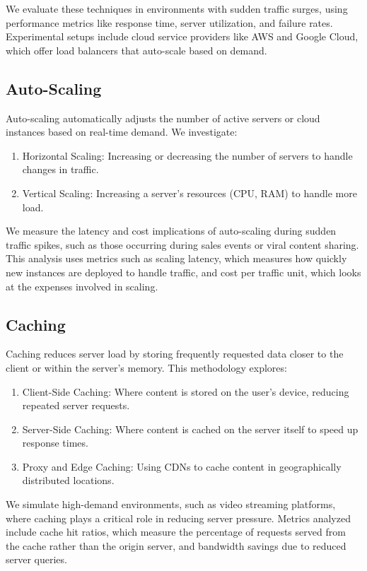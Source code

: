 \documentclass{article}
\begin{document}
We evaluate these techniques in environments with sudden traffic surges, using performance metrics like response time, server utilization, and failure rates. Experimental setups include cloud service providers like AWS and Google Cloud, which offer load balancers that auto-scale based on demand.

\subsection{Auto-Scaling}
Auto-scaling automatically adjusts the number of active servers or cloud instances based on real-time demand. We investigate:

\begin{enumerate}
    \item Horizontal Scaling: Increasing or decreasing the number of servers to handle changes in traffic.
    \item Vertical Scaling: Increasing a server’s resources (CPU, RAM) to handle more load.
\end{enumerate}

We measure the latency and cost implications of auto-scaling during sudden traffic spikes, such as those occurring during sales events or viral content sharing. This analysis uses metrics such as scaling latency, which measures how quickly new instances are deployed to handle traffic, and cost per traffic unit, which looks at the expenses involved in scaling.

\subsection{Caching}
Caching reduces server load by storing frequently requested data closer to the client or within the server's memory. This methodology explores:

\begin{enumerate}
    \item Client-Side Caching: Where content is stored on the user’s device, reducing repeated server requests.
    \item Server-Side Caching: Where content is cached on the server itself to speed up response times.
    
    \item Proxy and Edge Caching: Using CDNs to cache content in geographically distributed locations.
\end{enumerate}
We simulate high-demand environments, such as video streaming platforms, where caching plays a critical role in reducing server pressure. Metrics analyzed include cache hit ratios, which measure the percentage of requests served from the cache rather than the origin server, and bandwidth savings due to reduced server queries.
\end{document}
